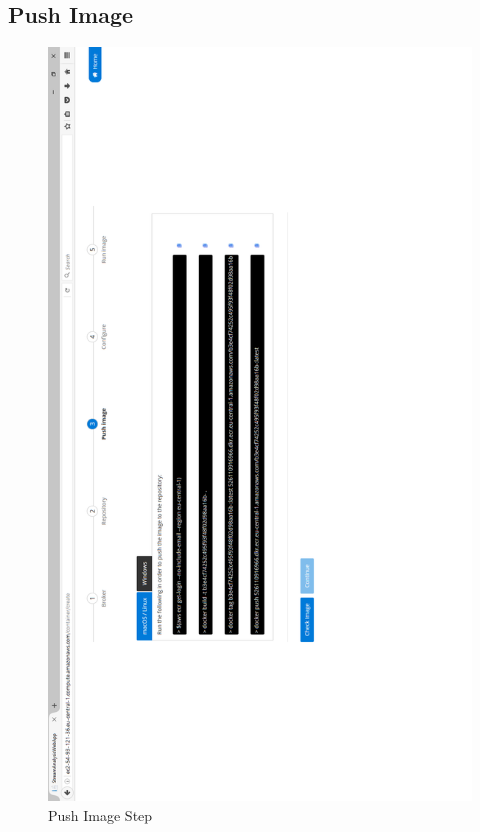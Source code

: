 \newpage

\subsection{Push Image}
\label{chap:05:01:03}

\begin{figure}[p]
	\centering
	\noindent
	\includegraphics[width=0.5\paperwidth]{./images/guide/container/pushImage.PNG}
	\caption{Push Image Step}
	\label{fig:pushImage}
\end{figure}

